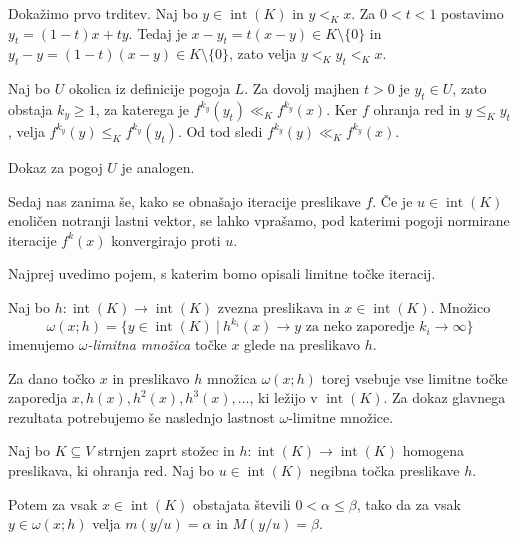 \documentclass[mat2, tisk]{fmfdelo}
\begin{document}
\begin{dokaz}
  Dokažimo prvo trditev. Naj bo $y\in\operatorname{int}(K)$ in
  $y<_K x$. Za $0<t<1$ postavimo
  $y_t=(1-t)x+ty$. Tedaj je
  $x-y_t=t(x-y)\in K\setminus\{0\}$ in
  $y_t-y=(1-t)(x-y)\in K\setminus\{0\}$, zato velja
  $y<_K y_t<_K x$.

  Naj bo $U$ okolica iz definicije pogoja $L$. Za dovolj majhen
  $t>0$ je $y_t\in U$, zato obstaja $k_y\geq1$, za katerega je
  $f^{k_y}(y_t)\ll_K f^{k_y}(x)$. Ker $f$ ohranja red in
  $y\leq_K y_t$, velja
  $f^{k_y}(y)\leq_K f^{k_y}(y_t)$. Od tod sledi
  $f^{k_y}(y)\ll_K f^{k_y}(x)$.

  Dokaz za pogoj $U$ je analogen.
\end{dokaz}

Sedaj nas zanima še, kako se obnašajo iteracije preslikave $f$.
Če je $u\in\operatorname{int}(K)$ enoličen notranji lastni vektor,
se lahko vprašamo, pod katerimi pogoji normirane iteracije
$f^k(x)$ konvergirajo proti $u$.

Najprej uvedimo pojem, s katerim bomo opisali limitne točke iteracij.

\begin{definicija}\label{def:omega_limitna_mnozica}
  Naj bo $h:\operatorname{int}(K)\longrightarrow\operatorname{int}(K)$
  zvezna preslikava in $x\in\operatorname{int}(K)$. Množico
  \[
  \omega(x;h)
  =
  \{y\in\operatorname{int}(K) ~|~
  h^{k_i}(x)\longrightarrow y
  \text{ za neko zaporedje } k_i\longrightarrow\infty\}
  \]
  imenujemo \emph{$\omega$-limitna množica} točke $x$ glede na
  preslikavo $h$.
\end{definicija}

Za dano točko $x$ in preslikavo $h$ množica $\omega(x;h)$ torej
vsebuje vse limitne točke zaporedja
$x,h(x),h^2(x),h^3(x),\ldots$, ki ležijo v
$\operatorname{int}(K)$.
Za dokaz glavnega rezultata potrebujemo še naslednjo lastnost
$\omega$-limitne množice.

\begin{lema}\label{lema:omega_homogena}
  Naj bo $K\subseteq V$ strnjen zaprt stožec in
  $h:\operatorname{int}(K)\longrightarrow\operatorname{int}(K)$
  homogena preslikava, ki ohranja red. Naj bo
  $u\in\operatorname{int}(K)$ negibna točka preslikave $h$.

  Potem za vsak $x\in\operatorname{int}(K)$ obstajata števili
  $0<\alpha\leq\beta$, tako da za vsak $y\in\omega(x;h)$ velja
  $m(y/u)=\alpha$ in $M(y/u)=\beta$.
\end{lema}
\end{document}

